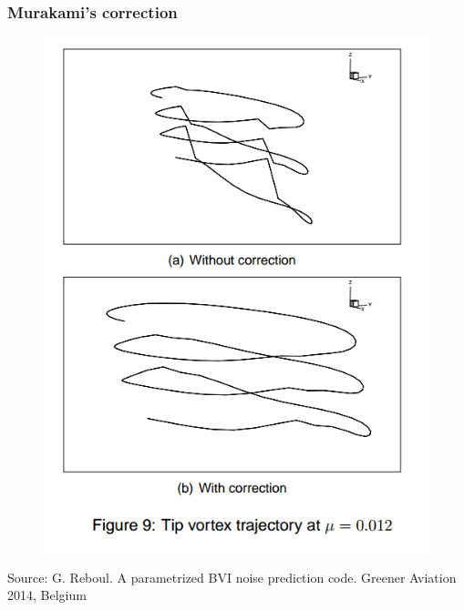 \documentclass[11pt]{beamer}
\begin{document}
\begin{frame}
\frametitle{Murakami's correction}
	\begin{figure}
	\includegraphics[scale=0.25]{Murakami_correction.png}
\end{figure}
{\tiny Source: G. Reboul. A parametrized BVI noise prediction code. Greener Aviation 2014, Belgium}
\end{frame}
\end{document}
